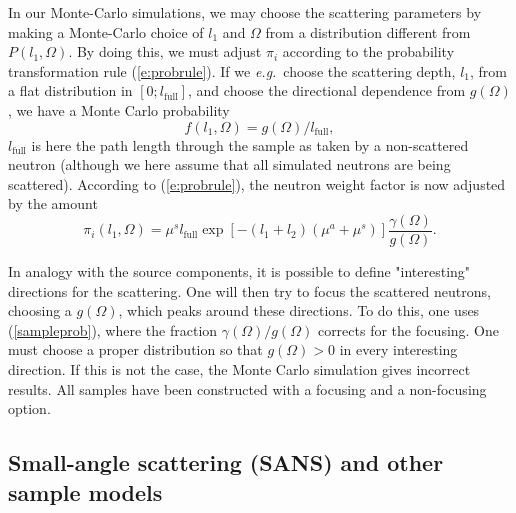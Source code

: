 In our Monte-Carlo simulations, we may choose the scattering
parameters by making a Monte-Carlo choice of $l_1$ and $\Omega$
from a distribution different from $P(l_1,\Omega)$.
By doing this, we must adjust $\pi_i$ according to
the probability transformation rule (\ref{e:probrule}).
If we {\em e.g.}\ choose the scattering depth, $l_1$,
from a flat distribution in $[ 0 ; l_\textrm{full} ]$,
and choose the directional dependence from $g(\Omega)$,
we have a Monte Carlo probability
\begin{equation}
f(l_1,\Omega) = g(\Omega) / l_\textrm{full} ,
\end{equation}
$l_\textrm{full}$ is here the path length through the sample
as taken by a non-scattered neutron (although we here
assume that all simulated neutrons are being scattered).
According to (\ref{e:probrule}), the neutron weight factor
is now adjusted by the amount
\begin{equation}     \label{sampleprob}
\pi_i(l_1,\Omega) =
 \mu^s l_\textrm{full} \exp \left[ - (l_1+l_2) (\mu^a + \mu^s) \right]
  \frac{\gamma(\Omega)}{g(\Omega)} .
\end{equation}

In analogy with the source components, it is possible to define
"interesting" directions for the scattering.
One will then try to focus the scattered neutrons,
choosing a $g(\Omega)$, which peaks around these directions.
To do this, one uses (\ref{sampleprob}), where the
fraction $\gamma(\Omega)/g(\Omega)$ corrects for the focusing.
One must choose a proper distribution so that
$g(\Omega) > 0$ in every interesting direction. If this is not the
case, the Monte Carlo simulation gives incorrect results.
All samples have been constructed with a focusing
and a non-focusing option.


\subsection{Small-angle scattering (SANS) and other sample models}

